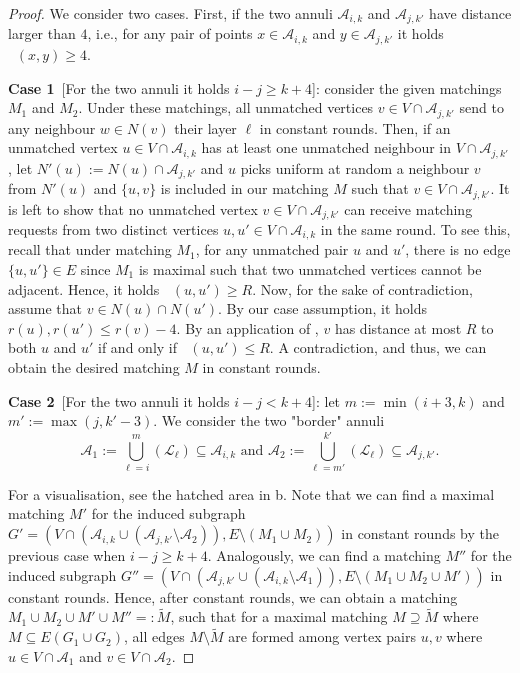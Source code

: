 \documentclass[letterpaper,11pt]{article}
\newcommand{\1}{\mathbb I}
\DeclareMathOperator{\dist}{d_h}
\newcommand{\Layer}[1]{\mathcal{L}_{#1}}
\newcommand{\block}[2]{\mathcal{A}_{#1,#2}}
\begin{document}
\begin{proof}
We consider two cases. First, if the two annuli $\block{i}{k}$ and $\block{j}{k'}$ have distance larger than $4$, i.e., for any pair of points $x \in \block{i}{k}$ and $y \in \block{j}{k'}$ it holds $\dist(x,y) \geq 4$.

\smallskip

\textbf{Case 1}~[For the two annuli it holds $i-j \geq k + 4$]: consider the given matchings $M_1$ and $M_2$. Under these matchings, all unmatched vertices $v \in V \cap \block{j}{k'}$ send to any neighbour $w \in N(v)$ their layer $\ell$ in constant rounds. Then, if an unmatched vertex $u \in  V \cap \block{i}{k}$ has at least one unmatched neighbour in $V \cap \block{j}{k'}$, let $N'(u):= N(u) \cap \block{j}{k'}$ and $u$ picks uniform at random a neighbour $v$ from $N'(u)$ and $\{u,v\}$ is included in our matching $M$ such that $v \in V \cap \block{j}{k'}$. It is left to show that no unmatched vertex $v \in V \cap \block{j}{k'}$ can receive matching requests from two distinct vertices $u, u' \in V \cap \block{i}{k}$ in the same round. To see this, recall that under matching $M_1$, for any unmatched pair $u$ and $u'$, there is no edge $\{u,u'\} \in E$ since $M_1$ is maximal such that two unmatched vertices cannot be adjacent. Hence, it holds $\dist(u,u') \geq R$. Now, for the sake of contradiction, assume that $v \in N(u) \cap N(u')$. By our case assumption, it holds $r(u), r(u') \leq r(v) - 4$. By an application of , $v$ has distance at most $R$ to both $u$ and $u'$ if and only if $\dist(u,u') \leq R$. A contradiction, and thus, we can obtain the desired matching $M$ in constant rounds.

\smallskip

\textbf{Case 2}~[For the two annuli it holds $i-j < k + 4$]: let $m := \min(i+3, k)$ and $m' := \max(j, k'-3)$. We consider the two "border" annuli $$\mathcal{A}_1 := \bigcup_{\ell = i}^m (\Layer{\ell}) \subseteq \block{i}{k} \text{ and } \mathcal{A}_2 := \bigcup_{\ell = m'}^{k'} (\Layer{\ell}) \subseteq \block{j}{k'}.$$ 

For a visualisation, see the hatched area in b. Note that we can find a maximal matching $M'$ for the induced subgraph $G' = (V \cap (\block{i}{k} \cup (\block{j}{k'} \setminus \mathcal{A}_2)), E \setminus (M_1 \cup M_2))$ in constant rounds by the previous case when $i-j \geq k + 4$. Analogously, we can find a matching $M''$ for the induced subgraph $G'' = (V \cap ( \block{j}{k'} \cup (\block{i}{k} \setminus \mathcal{A}_1)), E \setminus (M_1 \cup M_2 \cup M'))$ in constant rounds. Hence, after constant rounds, we can obtain a matching $M_1 \cup M_2 \cup M' \cup M'' =: \tilde{M}$, such that for a maximal matching $M \supseteq \tilde{M}$ where $M \subseteq E(G_1 \cup G_2)$, all edges $M\setminus \tilde{M}$ are formed among vertex pairs $u,v$ where $u \in V \cap \mathcal{A}_1$ and $v \in V \cap \mathcal{A}_2$. 


\end{proof}
\end{document}
